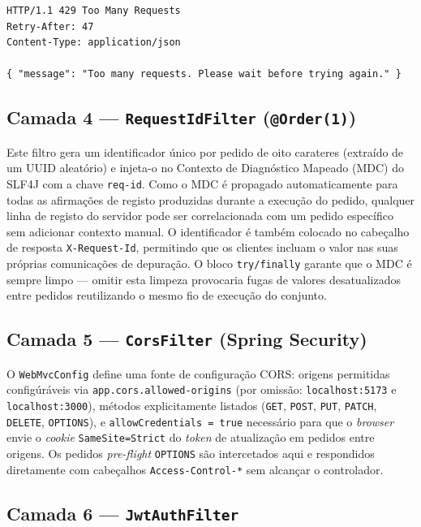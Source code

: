 \begin{verbatim}
HTTP/1.1 429 Too Many Requests
Retry-After: 47
Content-Type: application/json

{ "message": "Too many requests. Please wait before trying again." }
\end{verbatim}

\subsection*{Camada 4 — \texttt{RequestIdFilter} (\texttt{@Order(1)})}

Este filtro gera um identificador único por pedido de oito carateres
(extraído de um UUID aleatório) e injeta-o no Contexto de Diagnóstico
Mapeado (MDC) do SLF4J com a chave \texttt{req-id}.
Como o MDC é propagado automaticamente para todas as afirmações de registo
produzidas durante a execução do pedido, qualquer linha de registo do
servidor pode ser correlacionada com um pedido específico sem adicionar
contexto manual.
O identificador é também colocado no cabeçalho de resposta
\texttt{X-Request-Id}, permitindo que os clientes incluam o valor nas
suas próprias comunicações de depuração.
O bloco \texttt{try/finally} garante que o MDC é sempre limpo — omitir
esta limpeza provocaria fugas de valores desatualizados entre pedidos
reutilizando o mesmo fio de execução do conjunto.

\subsection*{Camada 5 — \texttt{CorsFilter} (Spring Security)}

O \texttt{WebMvcConfig} define uma fonte de configuração CORS:
origens permitidas configúráveis via \texttt{app.cors.allowed-origins}
(por omissão: \texttt{localhost:5173} e \texttt{localhost:3000}),
métodos explicitamente listados (\texttt{GET}, \texttt{POST}, \texttt{PUT},
\texttt{PATCH}, \texttt{DELETE}, \texttt{OPTIONS}), e
\texttt{allowCredentials = true} necessário para que o \textit{browser}
envie o \textit{cookie} \texttt{SameSite=Strict} do \textit{token} de
atualização em pedidos entre origens.
Os pedidos \textit{pre-flight} \texttt{OPTIONS} são intercetados aqui e
respondidos diretamente com cabeçalhos \texttt{Access-Control-*} sem
alcançar o controlador.

\subsection*{Camada 6 — \texttt{JwtAuthFilter}}

